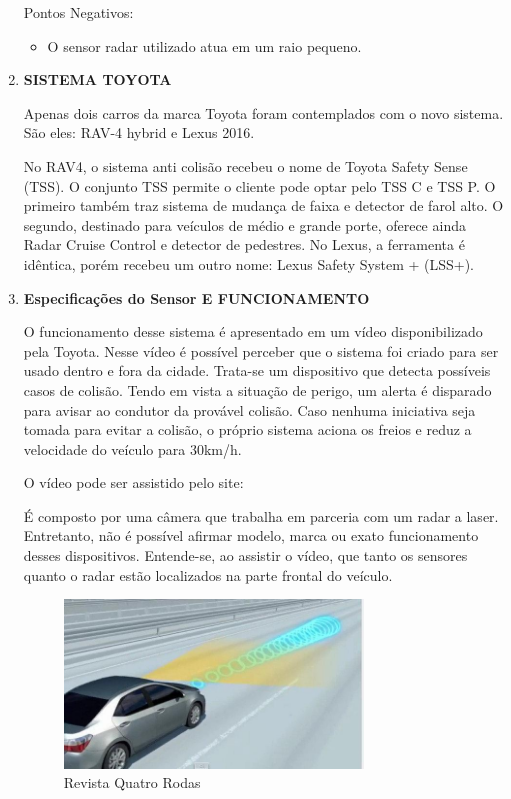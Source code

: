 \begin{enumerate}
  Pontos Negativos:
 \begin{itemize}
   \item O sensor radar utilizado atua em um raio pequeno.
 \end{itemize}

 \item \textbf{SISTEMA TOYOTA}

 Apenas dois carros da marca Toyota foram contemplados com o novo sistema.
 São eles: RAV-4 hybrid e Lexus 2016. \cite{3comper}

 No RAV4, o sistema anti colisão recebeu o nome de Toyota Safety Sense
 (TSS). O conjunto TSS permite o cliente pode optar pelo TSS C e TSS P. O
 primeiro também traz sistema de mudança de faixa e detector de farol alto.
  O segundo, destinado para veículos de médio e grande porte, oferece ainda
  Radar Cruise Control e detector de pedestres. No Lexus, a ferramenta é
  idêntica, porém recebeu um outro nome: Lexus Safety System + (LSS+).

  \item \textbf{Especificações do Sensor E FUNCIONAMENTO}

  O funcionamento desse sistema é apresentado em um vídeo disponibilizado pela
  Toyota. Nesse vídeo é possível perceber que o sistema foi criado para ser usado
  dentro e fora da cidade. Trata-se um dispositivo que detecta possíveis casos de
  colisão. Tendo em vista a situação de perigo, um alerta é disparado para avisar
  ao condutor da provável colisão. Caso nenhuma iniciativa seja tomada para evitar
  a colisão, o próprio sistema aciona os freios e reduz a velocidade do veículo para 30km/h.

  O vídeo pode ser assistido pelo site: \cite{4comper}

  É composto por uma câmera que trabalha em parceria com um radar a laser.
  Entretanto, não é possível afirmar modelo, marca ou exato funcionamento
  desses dispositivos. Entende-se, ao assistir o vídeo, que tanto os sensores
  quanto o radar estão localizados na parte frontal do veículo.


  \begin{figure}[h]
    \centering
    \includegraphics[width=300px, scale=1]{figuras/sinal_componentes}
    \caption{Revista Quatro Rodas}
  \label{fig:sinal_componentes}
  \end{figure}


\end{enumerate}
